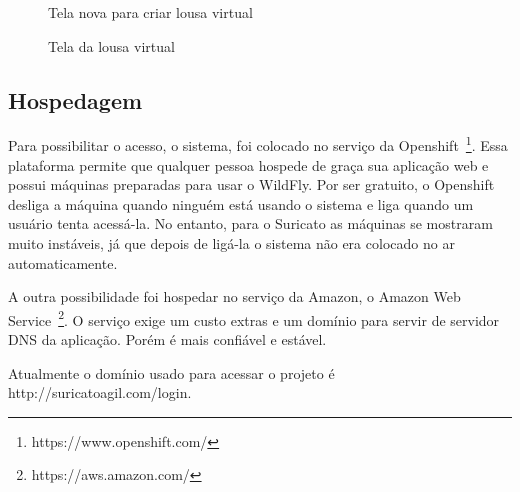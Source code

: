 \begin{figure}[H]
  \centering
  \caption{Tela nova para criar lousa virtual}\label{figura:criarNovo}
\end{figure}

\begin{figure}[H]
  \centering
  \caption{Tela da lousa virtual}\label{figura:Retrospectiva}
\end{figure}

\subsection{Hospedagem}

Para possibilitar o acesso, o sistema, foi colocado no serviço da Openshift~\footnote{https://www.openshift.com/}. Essa plataforma permite que qualquer pessoa hospede de graça sua aplicação web e possui máquinas preparadas para usar o WildFly. Por ser gratuito, o Openshift desliga a máquina quando ninguém está usando o sistema e liga quando um usuário tenta acessá-la. No entanto, para o Suricato as máquinas se mostraram muito instáveis, já que depois de ligá-la o sistema não era colocado no ar automaticamente. 

A outra possibilidade foi hospedar no serviço da Amazon, o Amazon Web Service~\footnote{https://aws.amazon.com/}. O serviço exige um custo extras e um domínio para servir de servidor DNS da aplicação. Porém é mais confiável e estável.

Atualmente o domínio usado para acessar o projeto é http://suricatoagil.com/login.